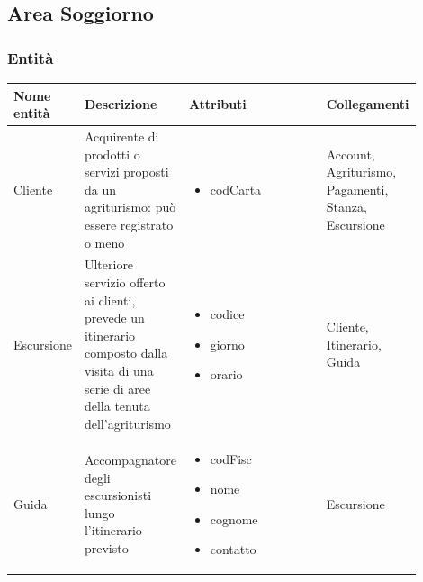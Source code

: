 \documentclass[12pt,a4paper]{article}
\begin{document}
\subsection{Area Soggiorno}
\subsubsection{Entità}
\label{Soggiorno Entita}
\begin{center}
\setlength{\extrarowheight}{1.5pt}
\begin{longtable}{|p{0.14\linewidth}|p{0.20\linewidth}|p{0.36\linewidth}|p{0.20\linewidth}|}
\hline 
\textbf{Nome entità} 	& \textbf{Descrizione} & \textbf{Attributi} & \textbf{Collegamenti}\\ 

\hline

    
\hline
Cliente				 	&  Acquirente di prodotti o servizi proposti da un agriturismo: può essere registrato o meno 
					& \begin{itemize}
						\setlength{\itemindent}{-1em}
						\vspace{-15pt}
						\setlength\itemsep{-0.25em}
						\item codCarta
					\end{itemize}
					&  Account, Agriturismo, Pagamenti, Stanza, Escursione  \\ 

\hline
Escursione				 	&  Ulteriore servizio offerto ai clienti, prevede un itinerario composto dalla visita di una serie di aree della tenuta dell'agriturismo 
					& \begin{itemize}
						\setlength{\itemindent}{-1em}
						\vspace{-25pt}
						\setlength\itemsep{-0.25em}
						\item codice
						\item giorno
						\item orario
						
					\end{itemize}
					&  Cliente, Itinerario, Guida  \\ 

\hline
Guida				 	&  Accompagna\-tore degli escursionisti lungo l'itinerario previsto 
					& \begin{itemize}
						\setlength{\itemindent}{-1em}
						\vspace{-25pt}
						\setlength\itemsep{-0.25em}
						\item codFisc
						\item nome
						\item cognome
						\item contatto
					\end{itemize}
					&  Escursione  \\ 


\end{longtable}
\end{center}
\end{document}
